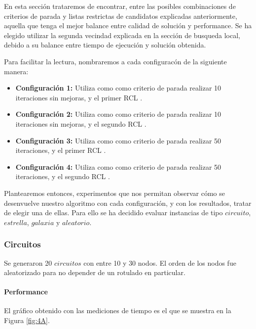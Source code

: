 \vspace*{0.3cm}

En esta sección trataremos de encontrar, entre las posibles combinaciones de criterios de parada y listas restrictas de candidatos explicadas anteriormente, aquella que tenga el mejor balance entre calidad de solución y performance. Se ha elegido utilizar la segunda vecindad explicada en la sección de busqueda local, debido a su balance entre tiempo de ejecución y solución obtenida.  

Para facilitar la lectura, nombraremos a cada configuracón de la siguiente manera:

\begin{itemize}
	\item {\bf Configuración 1:} Utiliza como como criterio de parada realizar 10 iteraciones sin mejoras, y el primer RCL .
	\item {\bf Configuración 2:} Utiliza como como criterio de parada realizar 10 iteraciones sin mejoras, y el segundo RCL .
	\item {\bf Configuración 3:} Utiliza como como criterio de parada realizar 50 iteraciones, y el primer RCL .
	\item {\bf Configuración 4:} Utiliza como como criterio de parada realizar 50 iteraciones, y el segundo RCL .

\end{itemize}

Plantearemos entonces, experimentos que nos permitan observar cómo se desenvuelve nuestro algoritmo con cada configuración, y con los resultados, tratar de elegir una de ellas. Para ello se ha decidido evaluar instancias de tipo $circuito$, $estrella$, $galaxia$ y $aleatorio$.
 
\subsubsection{Circuitos}

Se generaron 20 $circuitos$ con entre 10 y 30 nodos.  El orden de los nodos fue aleatorizado para no depender de un rotulado en particular.

\paragraph{Performance} 

El gráfico obtenido con las mediciones de tiempo es el que se muestra en la Figura \ref{fig:4A}.

